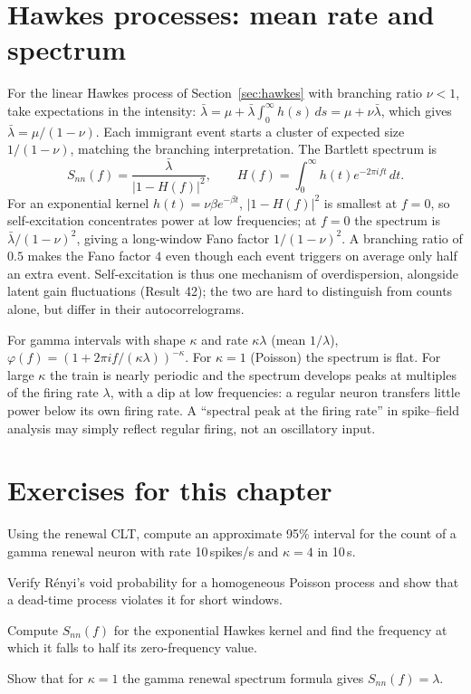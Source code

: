 \section{Hawkes processes: mean rate and spectrum}
For the linear Hawkes process of Section~\ref{sec:hawkes} with branching
ratio $\nu<1$, take expectations in the intensity:
$\bar\lambda=\mu+\bar\lambda\int_0^\infty h(s)\,ds=\mu+\nu\bar\lambda$,
which gives $\bar\lambda=\mu/(1-\nu)$. Each immigrant event starts a
cluster of expected size $1/(1-\nu)$, matching the branching
interpretation. The Bartlett spectrum is
\[
S_{nn}(f)=\frac{\bar\lambda}{|1-H(f)|^2},\qquad H(f)=\int_0^\infty h(t)e^{-2\pi ift}\,dt.
\]
For an exponential kernel $h(t)=\nu\beta e^{-\beta t}$, $|1-H(f)|^2$ is
smallest at $f=0$, so self-excitation concentrates power at low
frequencies; at $f=0$ the spectrum is $\bar\lambda/(1-\nu)^2$, giving a
long-window Fano factor $1/(1-\nu)^2$. A branching ratio of $0.5$ makes
the Fano factor $4$ even though each event triggers on average only half
an extra event. Self-excitation is thus one mechanism of overdispersion,
alongside latent gain fluctuations (Result 42); the two are hard to
distinguish from counts alone, but differ in their autocorrelograms.

\begin{example}
For gamma intervals with shape $\kappa$ and rate $\kappa\lambda$ (mean
$1/\lambda$), $\varphi(f)=(1+2\pi if/(\kappa\lambda))^{-\kappa}$. For
$\kappa=1$ (Poisson) the spectrum is flat. For large $\kappa$ the train
is nearly periodic and the spectrum develops peaks at multiples of the
firing rate $\lambda$, with a dip at low frequencies: a regular neuron
transfers little power below its own firing rate. A ``spectral peak at
the firing rate'' in spike--field analysis may simply reflect regular
firing, not an oscillatory input.
\end{example}

\section*{Exercises for this chapter}
\begin{exercise}
Using the renewal CLT, compute an approximate 95\% interval for the
count of a gamma renewal neuron with rate 10\,spikes/s and $\kappa=4$ in
10\,s.
\end{exercise}
\begin{exercise}
Verify R\'enyi's void probability for a homogeneous Poisson process and
show that a dead-time process violates it for short windows.
\end{exercise}
\begin{exercise}
Compute $S_{nn}(f)$ for the exponential Hawkes kernel and find the
frequency at which it falls to half its zero-frequency value.
\end{exercise}
\begin{exercise}
Show that for $\kappa=1$ the gamma renewal spectrum formula gives
$S_{nn}(f)=\lambda$.
\end{exercise}
